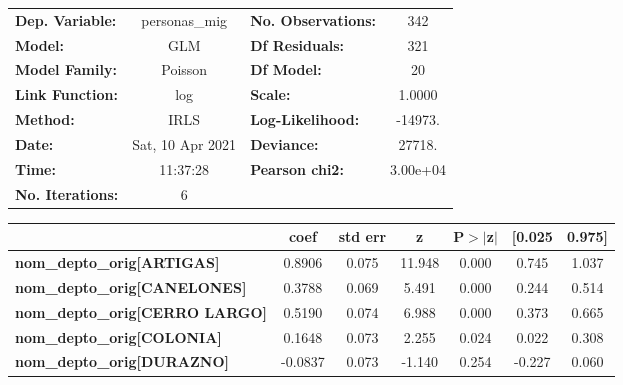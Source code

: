 \begin{center}
\begin{tabular}{lclc}
\toprule
\textbf{Dep. Variable:}                   &  personas\_mig   & \textbf{  No. Observations:  } &      342    \\
\textbf{Model:}                           &       GLM        & \textbf{  Df Residuals:      } &      321    \\
\textbf{Model Family:}                    &     Poisson      & \textbf{  Df Model:          } &       20    \\
\textbf{Link Function:}                   &       log        & \textbf{  Scale:             } &    1.0000   \\
\textbf{Method:}                          &       IRLS       & \textbf{  Log-Likelihood:    } &   -14973.   \\
\textbf{Date:}                            & Sat, 10 Apr 2021 & \textbf{  Deviance:          } &    27718.   \\
\textbf{Time:}                            &     11:37:28     & \textbf{  Pearson chi2:      } &  3.00e+04   \\
\textbf{No. Iterations:}                  &        6         & \textbf{                     } &             \\
\bottomrule
\end{tabular}
\begin{tabular}{lcccccc}
                                          & \textbf{coef} & \textbf{std err} & \textbf{z} & \textbf{P$> |$z$|$} & \textbf{[0.025} & \textbf{0.975]}  \\
\midrule
\textbf{nom\_depto\_orig[ARTIGAS]}        &       0.8906  &        0.075     &    11.948  &         0.000        &        0.745    &        1.037     \\
\textbf{nom\_depto\_orig[CANELONES]}      &       0.3788  &        0.069     &     5.491  &         0.000        &        0.244    &        0.514     \\
\textbf{nom\_depto\_orig[CERRO LARGO]}    &       0.5190  &        0.074     &     6.988  &         0.000        &        0.373    &        0.665     \\
\textbf{nom\_depto\_orig[COLONIA]}        &       0.1648  &        0.073     &     2.255  &         0.024        &        0.022    &        0.308     \\
\textbf{nom\_depto\_orig[DURAZNO]}        &      -0.0837  &        0.073     &    -1.140  &         0.254        &       -0.227    &        0.060     \\

\end{tabular}
\end{center}
